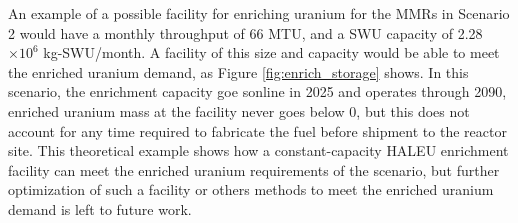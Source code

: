 An example of a 
possible facility for enriching uranium for the \glspl{MMR} in Scenario 2 would 
have a monthly throughput of 66 MTU, and a \gls{SWU} capacity of 2.28$\times 10^6$
kg-SWU/month. A facility of this size and capacity would be able to meet the 
enriched uranium demand, as Figure \ref{fig:enrich_storage}
shows. In this scenario, the enrichment capacity goe sonline in 2025 and operates 
through 2090, enriched uranium mass at the facility never goes below 0, but this does not 
account for any time required to fabricate the fuel before shipment to the reactor 
site. This theoretical example shows how a constant-capacity \gls{HALEU} enrichment 
facility can meet the enriched uranium requirements of the scenario, but further 
optimization of such a facility or others methods to meet the enriched uranium 
demand is left to future work. 

